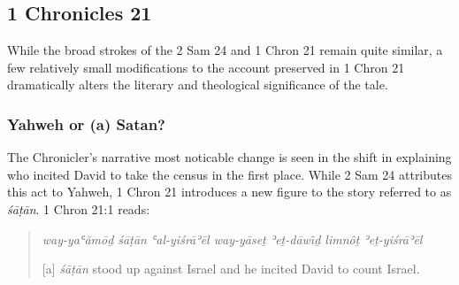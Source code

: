\subsection{1 Chronicles 21}\label{chronicles-21}

While the broad strokes of the 2 Sam 24 and 1 Chron 21 remain quite
similar, a few relatively small modifications to the account preserved
in 1 Chron 21 dramatically alters the literary and theological
significance of the tale.

\subsubsection{Yahweh or (a) Satan?}\label{yahweh-or-a-satan}

The Chronicler's narrative most noticable change is seen in the shift in
explaining who incited David to take the census in the first place.
While 2 Sam 24 attributes this act to Yahweh, 1 Chron 21 introduces a
new figure to the story referred to as \emph{śāṭān}. 1 Chron 21:1 reads:

\begin{quote}
\emph{way-yaʿămōḏ śāṭān ʿal-yiśrāʾēl way-yāseṯ ʾeṯ-dāwı̂ḏ limnôṯ
ʾeṯ-yiśrāʾēl}

{[}a{]} \emph{śāṭān} stood up against Israel and he incited David to
count Israel.
\end{quote}

